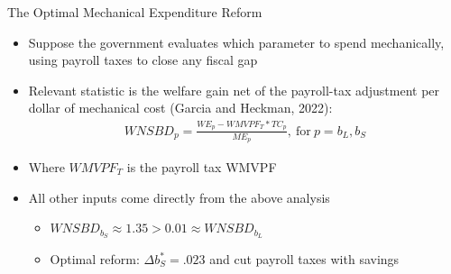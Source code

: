 \begin{frame}[label=expenditure]{The Optimal Mechanical Expenditure Reform}
    \begin{itemize}\item Suppose the government evaluates which parameter to spend mechanically, using payroll taxes to close any fiscal gap
\item Relevant statistic is the welfare gain net of the payroll-tax adjustment per dollar of mechanical cost (Garcia and Heckman, 2022):
        {
        \begin{align*}
            WNSBD_p= \frac{WE_p-WMVPF_T*TC_p}{ME_p}, \ \text{for} \ p=b_L,b_S
        \end{align*}}
        \item Where $WMVPF_T$ is the payroll tax WMVPF
        \item All other inputs come directly from the above analysis
        \begin{itemize}
            \item $WNSBD_{b_S}\approx 1.35>0.01\approx WNSBD_{b_L}$
            \item Optimal reform: $\Delta b_S^*=.023$ and cut payroll taxes with savings
        \end{itemize}
    \end{itemize}
\end{frame}

